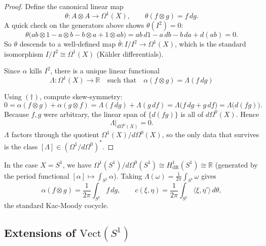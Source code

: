 \documentclass[12pt]{article}
\begin{document}
\begin{proof}
    Define the canonical linear map
    \[
        \theta: A \otimes A \longrightarrow \Omega^1(X),\qquad \theta(f \otimes g) = f\,dg.
    \]
    A quick check on the generators above shows $\theta(I^2) = 0$:
    \[
        \theta\big(ab \otimes 1 - a \otimes b - b \otimes a + 1 \otimes ab\big)
        = ab\,d1 - a\,db - b\,da + d(ab) = 0.
    \]
    So $\theta$ descends to a well-defined map $\bar\theta: I/I^2 \to \Omega^1(X)$, which is the standard isomorphism $I/I^2 \cong \Omega^1(X)$ (Kähler differentials).

    Since $\alpha$ kills $I^2$, there is a unique linear functional
    \[
        \Lambda: \Omega^1(X) \longrightarrow \mathbb{R}
        \quad\text{such that}\quad
        \alpha(f \otimes g) = \Lambda(f\,dg)
    \]

    Using $(†)$, compute skew-symmetry:
    \[
        0 = \alpha(f \otimes g) + \alpha(g \otimes f)
        = \Lambda(f\,dg) + \Lambda(g\,df)
        = \Lambda\big(f\,dg + g\,df\big)
        = \Lambda\big(d(fg)\big).
    \]
    Because $f,g$ were arbitrary, the linear span of $\{d(fg)\}$ is all of $d\Omega^0(X)$. Hence
    \[
        \Lambda|_{d\Omega^0(X)} = 0.
    \]
    $\Lambda$ factors through the quotient $\Omega^1(X)/d\Omega^0(X)$, so the only data that survives is the class $[\Lambda] \in (\Omega^1/d\Omega^0)^*$.
\end{proof}

\begin{remark}
    In the case $X = S^1$, we have $\Omega^1(S^1)/d\Omega^0(S^1) \cong H^1_{\mathrm{dR}}(S^1) \cong \mathbb{R}$ (generated by the period functional $[\alpha] \mapsto \int_{S^1}\alpha$).
    Taking $\Lambda(\omega) = \frac{1}{2\pi}\int_{S^1}\omega$ gives
    \[
        \alpha(f \otimes g) = \frac{1}{2\pi}\int_{S^1} f\,dg,
        \qquad
        c(\xi,\eta) = \frac{1}{2\pi}\int_{S^1}\!\langle \xi,\eta'\rangle\,d\theta,
    \]
    the standard Kac-Moody cocycle.
\end{remark}

\subsection{Extensions of $\mathrm{Vect}(S^1)$}
\end{document}
